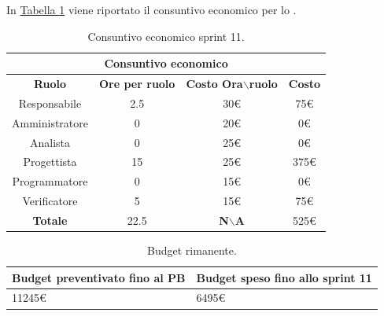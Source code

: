 In \hyperref[tab:sprint11_consuntivo_economico]{Tabella \ref{tab:sprint11_consuntivo_economico}} viene riportato il consuntivo economico per lo .
\begin{table}[H]
    \centering
    \begin{tabular}{|c|c|c|c|}
        \hline
            \multicolumn{4}{|c|}{\textbf{Consuntivo economico}} \\ 
        \hline
            \textbf{Ruolo} & \textbf{Ore per ruolo} & \textbf{Costo Ora$\backslash$ruolo} & \textbf{Costo} \\
        \hline
        Responsabile & 2.5 & 30€ & 75€ \\
        \hline
        Amministratore & 0 & 20€ & 0€ \\
        \hline
        Analista & 0 & 25€ & 0€ \\
        \hline
        Progettista & 15 & 25€ & 375€ \\
        \hline
        Programmatore & 0 & 15€ & 0€ \\
        \hline
        Verificatore & 5 & 15€ & 75€  \\
        \hline 
        \textbf{Totale} & 22.5 & \textbf{N$\backslash$A} & 525€  \\
        \hline
    \end{tabular}
    \caption{Consuntivo economico sprint 11.}
    \label{tab:sprint11_consuntivo_economico}
\end{table}

\begin{table}[H]
    \centering
    \begin{tabular}{| l | l |}
    \hline
    \textbf{Budget preventivato fino al PB} & \textbf{Budget speso fino allo sprint 11}\\
    \hline
        11245€ & 6495€ \\
    \hline
    \end{tabular}
    \caption{Budget rimanente.}
    \label{tab:budget_rimanente_sprint11}
\end{table}